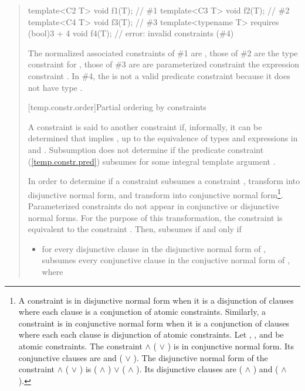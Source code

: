 \begin{quote}
\begin{codeblock}
template<C2 T> void f1(T);                            // \#1
template<C3 T> void f2(T);                            // \#2
template<C4 T> void f3(T);                            // \#3
template<typename T> requires (bool)3 + 4 void f4(T); // error: invalid constraints (\#4)
\end{codeblock}
The normalized associated constraints of \#1 are 
,
% 
those of \#2 are the type constraint for ,
%
those of \#3 are are parameterized constraint
 the expression constraint .
% 
In \#4, the  
is not a valid predicate constraint because it does not have type .
\exitexample


[temp.constr.order]{Partial ordering by constraints}

\pnum
A constraint  is said to  another constraint  
if, informally, it can be determined that  implies , up to 
the equivalence of types and expressions in  and .
% 
\enterexample
Subsumption does not determine if the predicate constraint 
 (\ref{temp.constr.pred}) subsumes  for some 
integral template argument .
\exitexample


\pnum
In order to determine if a constraint  subsumes a constraint
, transform  into disjunctive normal form, 
and transform  into conjunctive normal form\footnote{
A constraint is in disjunctive normal form when it is a disjunction of
clauses where each clause is a conjunction of atomic constraints. 
% 
Similarly, a constraint is in conjunctive normal form when it is a conjunction 
of clauses where each each clause is disjunction of atomic constraints.
% 
\enterexample
Let , , and  be atomic constraints.
% 
The constraint  $\land$ ( $\lor$ ) is in 
conjunctive normal form.
% 
Its conjunctive clauses are  and ( $\lor$ ).
% 
The disjunctive normal form of the constraint
 $\land$ ( $\lor$ ) 
is
( $\land$ ) $\lor$ ( $\land$ ).
% 
Its disjunctive clauses are ( $\land$ ) and 
( $\land$ ).
\exitexample
}.
% 
Parameterized constraints do not appear in conjunctive or disjunctive normal
forms. For the purpose of this transformation, the constraint
 is equivalent to the constraint .
% 
Then,  subsumes  if and only if
\begin{itemize}
\item for every disjunctive clause  in the disjunctive normal 
form of ,  subsumes every conjunctive clause  
in the conjuctive normal form of , where


\end{itemize}
\end{quote}
